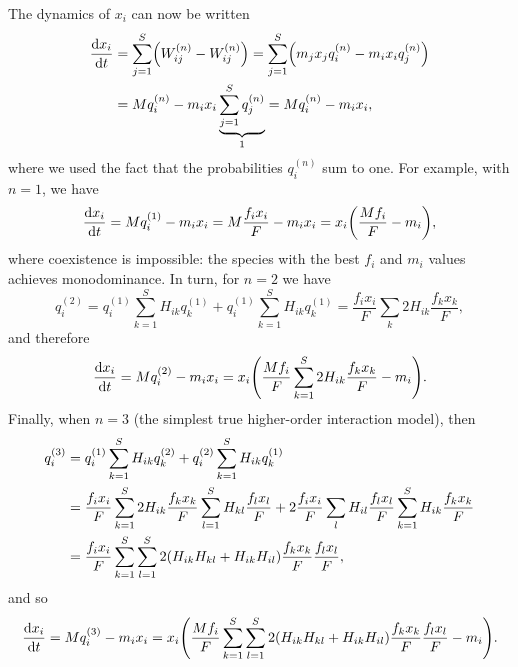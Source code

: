 \documentclass[11pt]{article}
\newcommand{\ud}{\text{d}}
\let\originalleft\left
\let\originalright\right
\renewcommand{\left}{\mathopen{}\mathclose\bgroup\originalleft}
\renewcommand{\right}{\aftergroup\egroup\originalright}
\begin{document}
The dynamics of $x_i$ can now be written
\begin{equation}
  \label{eq:xdot_basic}
  \begin{split}
    \frac{\ud x_i}{\ud t} &= \sum_{j=1}^S \left( W_{ij}^{(n)} - W_{ij}^{(n)}
    \right) = \sum_{j=1}^S \left( m_j x_j q_i^{(n)} - m_i x_i q_j^{(n)} \right)
    \\ &= M q_i^{(n)} - m_i x_i \underbrace{\sum_{j=1}^S q_j^{(n)}}_1
    = M q_i^{(n)} - m_i x_i,
  \end{split}
\end{equation}
where we used the fact that the probabilities $q_i^{(n)}$ sum to one. For example, with $n=1$, we have
\begin{equation}
  \label{eq:xdot_qi1_basic}
  \frac{\ud x_i}{\ud t} = M q_i^{(1)} - m_i x_i = M \frac{f_i x_i}{F} -
  m_i x_i = x_i \left( \frac{M f_i}{F} - m_i \right) ,
\end{equation}
where coexistence is impossible: the species with the best $f_i$ and $m_i$ values achieves monodominance. In turn, for $n=2$ we have
\begin{equation}
  \label{eq:qi2_basic}
  q_i^{(2)} = q_i^{(1)} \sum_{k=1}^S H_{ik} q_k^{(1)} + q_i^{(1)}
  \sum_{k=1}^S H_{ik} q_k^{(1)} = \frac{f_i x_i}{F} \sum_{k} 2 H_{ik}
  \frac{f_k x_k}{F} ,
\end{equation}
and therefore
\begin{equation}
  \label{eq:xdot_qi2_basic}
  \frac{\ud x_i}{\ud t} = M q_i^{(2)} - m_i x_i =
  x_i \left( \frac{M f_i}{F}\sum_{k=1}^S 2 H_{ik}\frac{f_k x_k}{F} - m_i\right) .
\end{equation}
Finally, when $n=3$ (the simplest true higher-order interaction model), then
\begin{equation}
  \label{eq:qi3_basic}
  \begin{split}
    q_i^{(3)} &= q_i^{(1)} \sum_{k=1}^S H_{ik} q_k^{(2)} + q_i^{(2)}
    \sum_{k=1}^S H_{ik} q_k^{(1)}
    \\ &= \frac{f_i x_i}{F} \sum_{k=1}^S 2 H_{ik} \frac{f_k x_k}{F}
    \sum_{l=1}^S H_{kl} \frac{f_l x_l}{F} + 2 \frac{f_i x_i}{F} \sum_{l} H_{il}
    \frac{f_l x_l}{F} \sum_{k=1}^S H_{ik} \frac{f_k x_k}{F}
    \\ &= \frac{f_i x_i}{F} \sum_{k=1}^S \sum_{l=1}^S 2 \left( H_{ik} H_{kl} +
      H_{ik}H_{il} \right) \frac{f_k x_k}{F} \frac{f_l x_l}{F} ,
  \end{split}
\end{equation}
and so
\begin{equation}
  \label{eq:xdot_qi3_basic}
  \frac{\ud x_i}{\ud t} = M q_i^{(3)} - m_i x_i
  = x_i \left( \frac{M f_i}{F} \sum_{k=1}^S \sum_{l=1}^S 2 \left( H_{ik} H_{kl} +
      H_{ik}H_{il} \right) \frac{f_k x_k}{F} \frac{f_l x_l}{F} - m_i \right) .
\end{equation}
\end{document}
